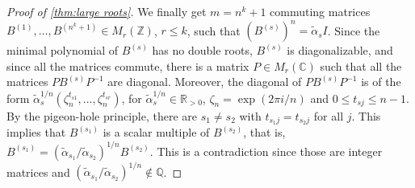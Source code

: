 \documentclass[10pt,a4paper]{amsart}
\newcommand{\C}{\mathbb{C}}
\newcommand{\Q}{\mathbb{Q}}
\newcommand{\R}{\mathbb{R}}
\newcommand{\Z}{\mathbb{Z}}
\newcommand{\wt}{\widetilde}
\begin{document}
\begin{proof}[Proof of \cref{thm:large roots}]
	
We finally get $m=n^{k}+1$ commuting matrices $B^{(1)},\ldots,B^{(n^{k}+1)}\in M_{r}(\Z)$, $r\le k$, such that $(B^{(s)})^{n}=\wt\alpha_{s}I$. 
Since the minimal polynomial of $B^{(s)}$ has no double roots, 
$B^{(s)}$ is diagonalizable, and since all the matrices commute, 
there is a matrix $P \in M_r(\C)$ such that all the matrices $PB^{(s)}P^{-1}$ are diagonal. 
Moreover, the diagonal of $PB^{(s)}P^{-1}$ is of the form $\wt\alpha_{s}^{1/n}(\zeta_{n}^{t_{s1}},\ldots,\zeta_{n}^{t_{sr}})$,
for $\wt\alpha_{s}^{1/n}\in\R_{>0}$, $\zeta_{n}=\exp(2\pi i/n)$ and $0\le t_{sj}\le n-1$. 
By the pigeon-hole principle, there are $s_{1}\neq s_{2}$ with $t_{s_{1}j}=t_{s_{2}j}$ for all $j$. 
This implies that $B^{(s_{1})}$ is a scalar multiple of $B^{(s_{2})}$, that is, $B^{(s_{1})}=\left(\wt\alpha_{s_1}/\wt\alpha_{s_2}\right)^{1/n}B^{(s_2)}$.
This is a contradiction since those are integer matrices and $\left(\wt\alpha_{s_1}/\wt\alpha_{s_2}\right)^{1/n}\notin\Q$.
\end{proof}
\end{document}
